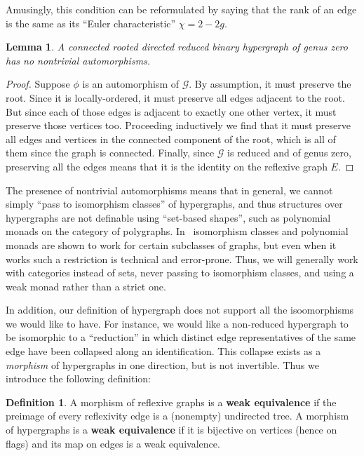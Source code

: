 \documentclass{article}
\newtheorem{lem}[thm]{Lemma}
\theoremstyle{definition}
\newtheorem{defn}[thm]{Definition}
\theoremstyle{remark}
\def\G{\mathcal{G}}
\begin{document}
Amusingly, this condition can be reformulated by saying that the rank of an edge is the same as its ``Euler characteristic'' $\chi=2-2g$.

\begin{lem}
  A connected rooted directed reduced binary hypergraph of genus zero has no nontrivial automorphisms.
\end{lem}
\begin{proof}
  Suppose $\phi$ is an automorphism of $\G$.
  By assumption, it must preserve the root.
  Since it is locally-ordered, it must preserve all edges adjacent to the root.
  But since each of those edges is adjacent to exactly one other vertex, it must preserve those vertices too.
  Proceeding inductively we find that it must preserve all edges and vertices in the connected component of the root, which is all of them since the graph is connected.
  Finally, since $\G$ is reduced and of genus zero, preserving all the edges means that it is the identity on the reflexive graph $E$.
\end{proof}

The presence of nontrivial automorphisms means that in general, we cannot simply ``pass to isomorphism classes'' of hypergraphs, and thus structures over hypergraphs are not definable using ``set-based shapes'', such as polynomial monads on the category of polygraphs.
In~\cite{bb:htapm} isomorphism classes and polynomial monads are shown to work for certain subclasses of graphs, but even when it works such a restriction is technical and error-prone.
Thus, we will generally work with categories instead of sets, never passing to isomorphism classes, and using a weak monad rather than a strict one.

In addition, our definition of hypergraph does not support all the isoomorphisms we would like to have.
For instance, we would like a non-reduced hypergraph to be isomorphic to a ``reduction'' in which distinct edge representatives of the same edge have been collapsed along an identification.
This collapse exists as a \emph{morphism} of hypergraphs in one direction, but is not invertible.
Thus we introduce the following definition:

\begin{defn}\label{defn:weq}
  A morphism of reflexive graphs is a \textbf{weak equivalence} if the preimage of every reflexivity edge is a (nonempty) undirected tree.
  A morphism of hypergraphs is a \textbf{weak equivalence} if it is bijective on vertices (hence on flags) and its map on edges is a weak equivalence.
\end{defn}
\end{document}

